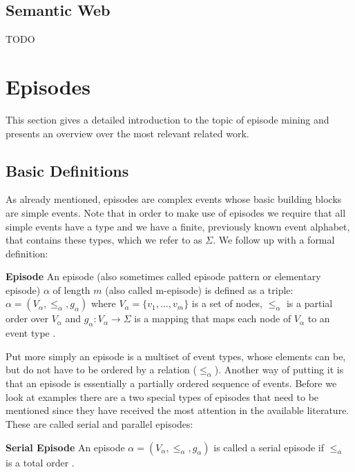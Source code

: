 \subsection{Semantic Web}
\label{subsec_semanticWeb}
TODO





\section{Episodes}
\label{sec_episodes}
This section gives a detailed introduction to the topic of episode mining and presents an overview over the most relevant related work.

\subsection{Basic Definitions}

As already mentioned, episodes are complex events whose basic building blocks are simple events. Note that  in order to make use of episodes we require that all simple events have a type and we have a finite, previously known event alphabet, that contains these types, which we refer to as $\Sigma$. We follow up with a formal definition:

\begin{mydef}
\textbf{Episode} An episode (also sometimes called episode pattern or elementary episode) $\alpha$ of length $m$ (also called m-episode) is defined as a triple: $\alpha = (V_\alpha,{\leq}_{\alpha},g_\alpha)$ where $V_\alpha = \{v_1,...,v_m\}$ is a set of nodes, ${\leq}_{\alpha}$ is a partial order over $V_\alpha$ and $g_\alpha : V_\alpha \rightarrow \Sigma$ is a mapping that maps each node of $V_\alpha$ to an event type \cite{mannila1995discovering}.
\end{mydef}

Put more simply an episode is a multiset of event types, whose elements can be, but do not have to be ordered by a relation (${\leq}_{\alpha}$). Another way of putting it is that an episode is essentially a partially ordered sequence of events. Before we look at examples there are a two special types of episodes that need to be mentioned since they have received the most attention in the available literature. These are called serial and parallel episodes:

\begin{mydef}
\textbf{Serial Episode} An episode $\alpha = (V_\alpha,{\leq}_{\alpha},g_\alpha)$ is called a serial episode if ${\leq}_{\alpha}$ is a total order \cite{mannila1995discovering}.
\end{mydef}

